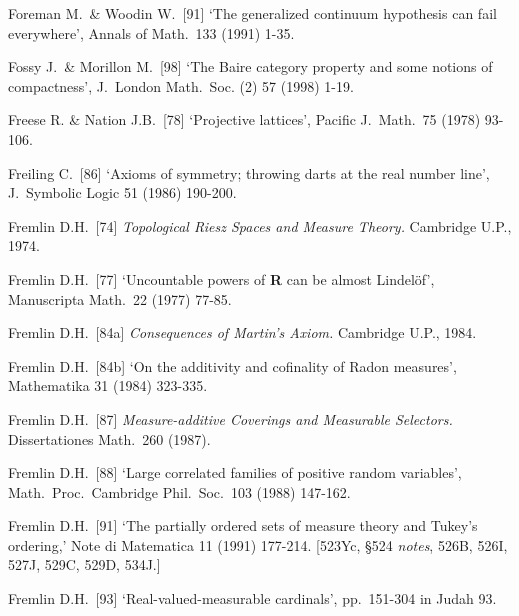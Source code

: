 {Foreman M.\ \& Woodin W.\ [91] `The generalized continuum hypothesis can
fail everywhere', Annals of Math.\ 133 (1991) 1-35.
\cmmnt{[525Z.]}

Fossy J.\ \& Morillon M.\ [98] `The Baire category property and some
notions of compactness', J.\ London Math.\ Soc. (2) 57 (1998) 1-19.
\cmmnt{[\S566 {\it notes\/}.]}



Freese R. \& Nation J.B.\ [78] `Projective lattices',
Pacific J.\ Math.\ 75 (1978) 93-106.
\cmmnt{[\S518 {\it notes\/}.]}

Freiling C.\ [86] `Axioms of symmetry;  throwing darts at the real number
line', J.\ Symbolic Logic 51 (1986) 190-200.
\cmmnt{[537K.]}

Fremlin D.H.\ [74] {\it Topological Riesz Spaces and Measure Theory.}
Cambridge U.P., 1974.
\cmmnt{[564Xc.]}

Fremlin D.H.\ [77]
`Uncountable powers of {\bf R} can be almost Lindel\"of',
Manuscripta Math.\ 22 (1977) 77-85.
\cmmnt{[533J.]}

Fremlin D.H.\ [84a] {\it Consequences of Martin's Axiom.}
Cambridge U.P., 1984.

Fremlin D.H.\ [84b] `On the additivity and cofinality of Radon measures',
Mathematika 31 (1984) 323-335.
\cmmnt{[\S524 {\it notes\/}.]}

Fremlin D.H.\ [87] {\it Measure-additive Coverings and
Measurable Selectors.} Dissertationes Math.\ 260 (1987).
\cmmnt{[551A.]}

Fremlin D.H.\ [88] `Large correlated families of positive
random variables',
Math.\ Proc.\ Cambridge Phil.\ Soc.\ 103 (1988) 147-162.
\cmmnt{[525S.]}

Fremlin D.H.\ [91] `The partially ordered sets of measure
theory and Tukey's ordering,' Note di Matematica  11 (1991) 177-214.
[523Yc, \S524 {\it notes\/}, 526B, 526I, 527J, 529C, 529D, 534J.]

Fremlin D.H.\ [93] `Real-valued-measurable cardinals', pp.\ 151-304
in {\smc Judah 93}.

}
